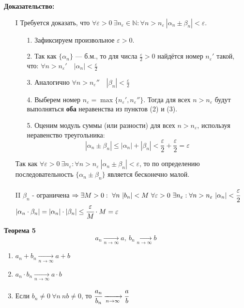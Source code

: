 \documentclass[12pt, paper]{article}
\newcommand{\eps}{\varepsilon}
\begin{document}
\begin{tcolorbox}[title=Доказательство Т4: Предел суммы/разности б.м. последовательностей, breakable]
\small

\textbf{Доказательство:}
\begin{enumerate}

\item[I] Требуется доказать, что \( \forall \varepsilon > 0\ \exists n_\varepsilon \in \mathbb{N} : \forall n > n_\varepsilon\ |\alpha_n \pm \beta_n| < \varepsilon \).

\begin{enumerate}
    \item[1.] Зафиксируем произвольное \( \varepsilon > 0 \).
    \item[2.] Так как \( \{\alpha_n\} \) — б.м., то для числа \( \frac{\varepsilon}{2} > 0 \) найдётся номер \( n_{\varepsilon}' \) такой, что: $\forall n > n_{\varepsilon}'\quad |\alpha_n| < \frac{\varepsilon}{2}$
    
    \item[3.] Аналогично $\forall n > n_{\varepsilon}''\quad |\beta_n| < \frac{\varepsilon}{2}$
    
    \item[4.] Выберем номер \( n_\varepsilon = \max\{n_{\varepsilon}', n_{\varepsilon}''\} \). Тогда для всех \( n > n_\varepsilon \) будут выполняться \textbf{оба} неравенства из пунктов (2) и (3).
    \item[5.] Оценим модуль суммы (или разности) для всех \( n > n_\varepsilon \), используя неравенство треугольника:
    \[
    |\alpha_n \pm \beta_n| \leq |\alpha_n| + |\beta_n| < \frac{\varepsilon}{2} + \frac{\varepsilon}{2} = \varepsilon
    \]
\end{enumerate}

Так как \( \forall \varepsilon > 0\ \exists n_\varepsilon: \forall n > n_\eps\ |\alpha_n \pm \beta_n| < \varepsilon \), то по определению последовательность \( \{\alpha_n \pm \beta_n\} \) является бесконечно малой.

\item[II] {$\beta_n$} - ограничена $\Rightarrow \exists M > 0:\ \forall n \ |b_n| < M \ \forall\eps > 0\ \exists n_\eps : \forall n > n_\eps\ |\alpha_n| < \cfrac{\eps}{2}$\\
$|\alpha_n \cdot \beta_n|= |\alpha_n| \cdot |\beta_n| \leq \cfrac{\eps}{M} \cdot M = \eps$
\end{enumerate}
\end{tcolorbox}

\begin{tcolorbox}
\textbf{Теорема 5}
\[ a_n \xrightarrow[n\rightarrow \infty]{}a,\ b_n \xrightarrow[n\rightarrow \infty]{}b\]
\begin{enumerate}
    \item $a_n + b_n \xrightarrow[n\rightarrow \infty]{} a + b$
    \item $a_n \cdot b_n \xrightarrow[n\rightarrow \infty]{} a \cdot b$
    \item Если $b_n \ne 0\ \forall n \ nb \ne 0$, то $\cfrac{a_n}{b_n} \xrightarrow[n\rightarrow \infty]{} \cfrac{a}{b}$
\end{enumerate}
\end{tcolorbox}
\end{document}
